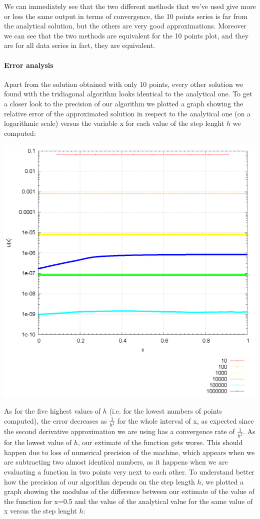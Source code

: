 \documentclass[10pt,a4paper,titlepage]{article}
\begin{document}
We can immediately see that the two different methods that we've used give more or less the same output in terms of convergence, the 10 points series is far from the analytical solution, but the others are very good approximations. Moreover we can see that the two methods are equivalent for the 10 points plot, and they are for all data series in fact, they are equivalent.\\

\paragraph{Error analysis}
Apart from the solution obtained with only 10 points, every other solution we found with the tridiagonal algorithm looks identical to the analytical one.
To get a closer look to the precision of our algorithm we plotted a graph showing the relative error of the approximated solution in respect to the analytical one (on a logarithmic scale) versus the variable x for each value of the step lenght $h$ we computed:
\begin{center}
	\includegraphics[width=0.5\columnwidth]{plot_err.png}		
\end{center}
    As for the five highest values of $h$ (i.e. for the lowest numbers of points computed), the error decreases as $\frac{1}{h^2}$ for the whole interval of x, as expected since the second derivative approximation we are using has a convergence rate of $\frac{1}{h^2}$. As for the lowest value of $h$, our extimate of the function gets worse. This should happen due to loss of numerical precision of the machine, which appears when we are subtracting two almost identical numbers, as it happens when we are evaluating a function in two points very next to each other.
To understand better how the precision of our algorithm depends on the step length $h$, we plotted a graph showing the modulus of the difference between our extimate of the value of the function for x=0.5 and the value of the analytical value for the same value of x versus the step lenght $h$:
\end{document}
